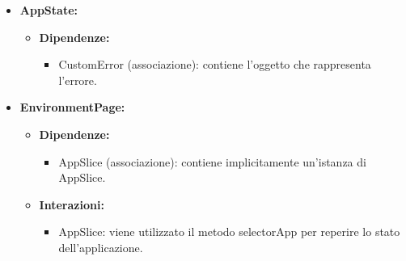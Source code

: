 \begin{itemize}
    \item \textbf{AppState:}
          \begin{itemize}
              \item \textbf{Dipendenze:}
                    \begin{itemize}
                        \item CustomError (associazione): contiene l'oggetto che rappresenta l'errore.
                    \end{itemize}
          \end{itemize}

    \item \textbf{EnvironmentPage:}
          \begin{itemize}
              \item \textbf{Dipendenze:}
                    \begin{itemize}
                        \item AppSlice (associazione): contiene implicitamente un'istanza di AppSlice.
                    \end{itemize}
              \item \textbf{Interazioni:}
                    \begin{itemize}
                        \item AppSlice: viene utilizzato il metodo selectorApp per reperire lo stato
                              dell'applicazione.
                    \end{itemize}
          \end{itemize}
\end{itemize}

